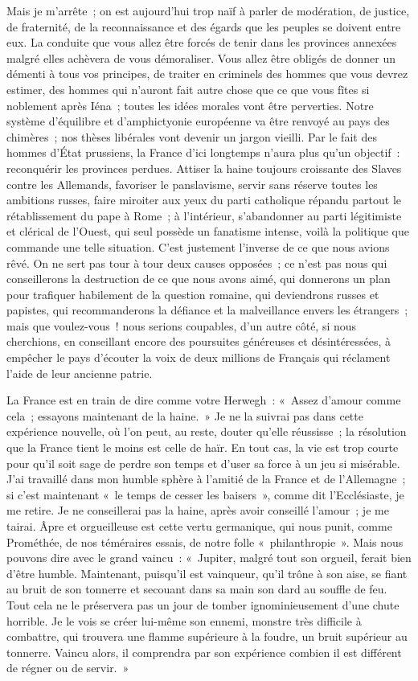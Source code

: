 \documentclass[french,twoside]{book} %
\begin{document}
Mais je m’arrête ; on est aujourd’hui trop naïf à parler de modération, de justice, de fraternité, de la reconnaissance et des égards que les peuples se doivent entre eux. La conduite que vous allez être forcés de tenir dans les provinces annexées malgré elles achèvera de vous démoraliser. Vous allez être obligés de donner un démenti à tous vos principes, de traiter en criminels des hommes que vous devrez estimer, des hommes qui n’auront fait autre chose que ce que vous fîtes si noblement après Iéna ; toutes les idées morales vont être perverties. Notre système d’équilibre et d’amphictyonie européenne va être renvoyé au pays des chimères ; nos thèses libérales vont devenir un jargon vieilli. Par le fait des hommes d’État prussiens, la France d’ici longtemps n’aura plus qu’un objectif : reconquérir les provinces perdues. Attiser la haine toujours croissante des Slaves contre les Allemands, favoriser le panslavisme, servir sans réserve toutes les ambitions russes, faire miroiter aux yeux du parti catholique répandu partout le rétablissement du pape à Rome ; à l’intérieur, s’abandonner au parti légitimiste et clérical de l’Ouest, qui seul possède un fanatisme intense, voilà la politique que commande une telle situation. C’est justement l’inverse de ce que nous avions rêvé. On ne sert pas tour à tour deux causes opposées ; ce n’est pas nous qui conseillerons la destruction de ce que nous avons aimé, qui donnerons un plan pour trafiquer habilement de la question romaine, qui deviendrons russes et papistes, qui recommanderons la défiance et la malveillance envers les étrangers ; mais que voulez-vous ! nous serions coupables, d’un autre côté, si nous cherchions, en conseillant encore des poursuites généreuses et désintéressées, à empêcher le pays d’écouter la voix de deux millions de Français qui réclament l’aide de leur ancienne patrie.\par
La France est en train de dire comme votre Herwegh : « Assez d’amour comme cela ; essayons maintenant de la haine. » Je ne la suivrai pas dans cette expérience nouvelle, où l’on peut, au reste, douter qu’elle réussisse ; la résolution que la France tient le moins est celle de haïr. En tout cas, la vie est trop courte pour qu’il soit sage de perdre son temps et d’user sa force à un jeu si misérable. J’ai travaillé dans mon humble sphère à l’amitié de la France et de l’Allemagne ; si c’est maintenant « le temps de cesser les baisers », comme dit l’Ecclésiaste, je me retire. Je ne conseillerai pas la haine, après avoir conseillé l’amour ; je me tairai. Âpre et orgueilleuse est cette vertu germanique, qui nous punit, comme Prométhée, de nos téméraires essais, de notre folle « philanthropie ». Mais nous pouvons dire avec le grand vaincu : « Jupiter, malgré tout son orgueil, ferait bien d’être humble. Maintenant, puisqu’il est vainqueur, qu’il trône à son aise, se fiant au bruit de son tonnerre et secouant dans sa main son dard au souffle de feu. Tout cela ne le préservera pas un jour de tomber ignominieusement d’une chute horrible. Je le vois se créer lui-même son ennemi, monstre très difficile à combattre, qui trouvera une flamme supérieure à la foudre, un bruit supérieur au tonnerre. Vaincu alors, il comprendra par son expérience combien il est différent de régner ou de servir. »\par
\end{document}

